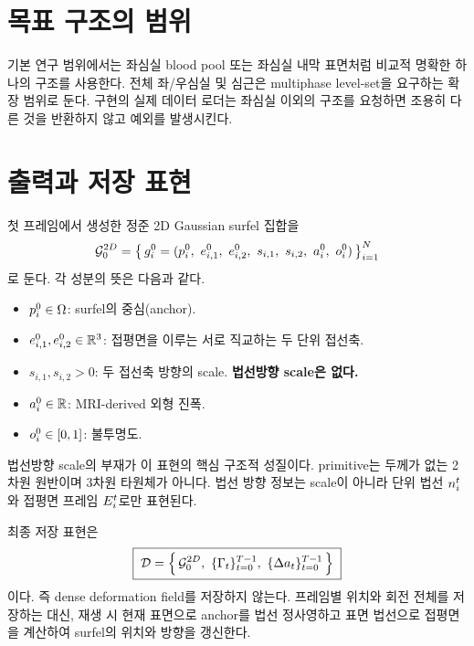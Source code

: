 \section{목표 구조의 범위}

기본 연구 범위에서는 좌심실 blood pool 또는 좌심실 내막 표면처럼 비교적 명확한
하나의 구조를 사용한다. 전체 좌/우심실 및 심근은 multiphase level-set을 요구하는
확장 범위로 둔다. 구현의 실제 데이터 로더는 좌심실 이외의 구조를 요청하면
조용히 다른 것을 반환하지 않고 예외를 발생시킨다.

\section{출력과 저장 표현}
\label{sec:storage-def}

첫 프레임에서 생성한 정준 2D Gaussian surfel 집합을
\begin{equation}
  \Gcan = \bigl\{\, g^0_i = (\anchor^0_i,\ e^0_{i,1},\ e^0_{i,2},\
  s_{i,1},\ s_{i,2},\ \amp^0_i,\ \opa^0_i) \,\bigr\}_{i=1}^{N}
  \label{eq:canonical-set}
\end{equation}
로 둔다. 각 성분의 뜻은 다음과 같다.

\begin{itemize}[leftmargin=2em]
  \item $p^0_i \in \Omega$: surfel의 중심(anchor).
  \item $e^0_{i,1}, e^0_{i,2} \in \mathbb{R}^3$: 접평면을 이루는 서로 직교하는 두 단위
  접선축.
  \item $s_{i,1}, s_{i,2} > 0$: 두 접선축 방향의 scale. \textbf{법선방향 scale은 없다.}
  \item $a^0_i \in \mathbb{R}$: MRI-derived 외형 진폭.
  \item $o^0_i \in [0,1]$: 불투명도.
\end{itemize}

법선방향 scale의 부재가 이 표현의 핵심 구조적 성질이다. primitive는 두께가 없는
2차원 원반이며 3차원 타원체가 아니다. 법선 방향 정보는 scale이 아니라 단위 법선
$n^t_i$와 접평면 프레임 $E^t_i$로만 표현된다.

최종 저장 표현은
\begin{equation}
  \boxed{\;
  \mathcal{D} = \Bigl\{\, \mathcal{G}^{2D}_0,\ \{\Gamma_t\}_{t=0}^{T-1},\ \{\Delta a_t\}_{t=0}^{T-1} \,\Bigr\}
  \;}
  \label{eq:store}
\end{equation}
이다. 즉 dense deformation field를 저장하지 않는다. 프레임별 위치와 회전 전체를
저장하는 대신, 재생 시 현재 표면으로 anchor를 법선 정사영하고 표면 법선으로 접평면을
계산하여 surfel의 위치와 방향을 갱신한다.

